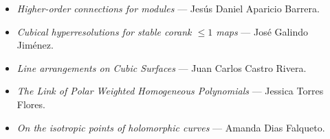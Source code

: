 \documentclass[11pt,a4paper]{article}
\begin{document}
\begin{itemize}[leftmargin=*]
    \item \emph{Higher-order connections for modules} --- Jesús Daniel Aparicio Barrera.
    \item \emph{Cubical hyperresolutions for stable corank $\leq 1$ maps} --- José Galindo Jiménez.
    \item \emph{Line arrangements on Cubic Surfaces} --- Juan Carlos Castro Rivera.
    \item \emph{The Link of Polar Weighted Homogeneous Polynomials} --- Jessica Torres Flores.
    \item \emph{On the isotropic points of holomorphic curves} --- Amanda Dias Falqueto.
\end{itemize}
\end{document}
